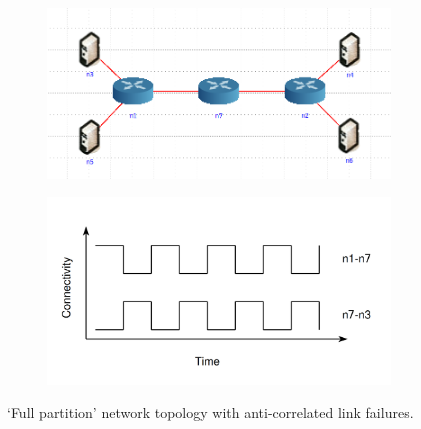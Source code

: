 \documentclass[withindex,glossary,openany]{cam-thesis}
\begin{document}
\begin{figure}[H]
\centering
\begin{subfigure}{.5\textwidth}
  \centering
  \includegraphics[width=1\linewidth]{delay_full_partition_topology}
  \label{fig:full_partition_topology}
\end{subfigure}%
\begin{subfigure}{.5\textwidth}
  \centering
  \includegraphics[width=1\linewidth]{delay_full_partition_graph}
  \label{fig:full_partition_graph}
\end{subfigure}
\caption{`Full partition' network topology with anti-correlated link failures.}
\label{fig:full_partition}
\end{figure}
\end{document}
